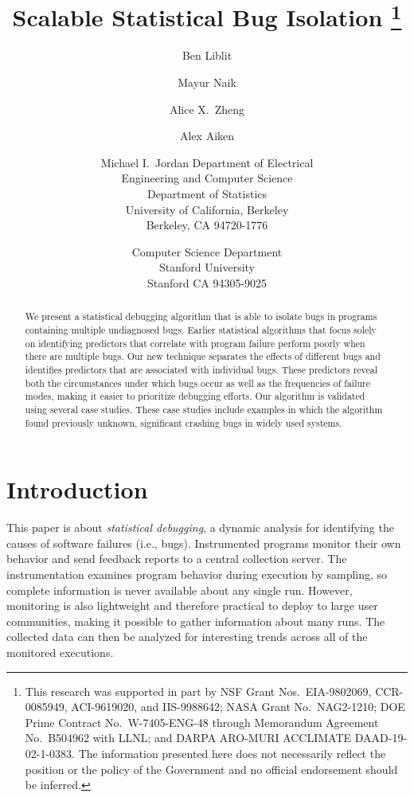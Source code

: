 \documentclass[draft]{sig-alternate}
\title{Scalable Statistical Bug Isolation
  \renewcommand{\footnotemark}[0]{}
  \thanks{This research was supported in part by NSF Grant Nos.\
    EIA-9802069, CCR-0085949, ACI-9619020, and IIS-9988642; NASA Grant
    No.\ NAG2-1210; DOE Prime Contract No.\ W-7405-ENG-48 through
    Memorandum Agreement No.\ B504962 with LLNL; and DARPA ARO-MURI
    ACCLIMATE DAAD-19-02-1-0383.  The information presented here does
    not necessarily reflect the position or the policy of the
    Government and no official endorsement should be inferred.}}
\author{%
  Ben Liblit \eecs
  \and Mayur Naik \stan
  \and Alice X.\ Zheng \eecs
  \and Alex Aiken \stan
  \and Michael I.\ Jordan \both
  \moreauthors
  \eecs Department of Electrical \\
  Engineering and Computer Science \\
  \stat Department of Statistics \\
  University of California, Berkeley \\
  Berkeley, CA 94720-1776
  \and
  \stan Computer Science Department \\
  Stanford University \\
  Stanford CA 94305-9025
}
\newcommand{\termdef}[1]{\emph{#1}}
\begin{document}
\maketitle

\begin{abstract}
  We present a statistical debugging algorithm that is able to
  isolate bugs in programs containing multiple undiagnosed bugs.  
  Earlier statistical algorithms that focus solely on identifying
  predictors that correlate with program failure perform poorly
  when there are multiple bugs.  Our new technique separates the
  effects of different bugs and identifies predictors that are
  associated with individual bugs.  These predictors reveal both the
  circumstances under which bugs occur as well as the frequencies of
  failure modes, making it easier to prioritize debugging efforts.
  Our algorithm is validated using several case studies.  These 
  case studies include examples in which the algorithm found previously 
  unknown, significant crashing bugs in widely used systems.  
\end{abstract}






\section{Introduction}
\label{sec:introduction}

This paper is about \termdef{statistical debugging}, a dynamic
analysis for identifying the causes of software failures (i.e., bugs).
Instrumented programs monitor their own behavior and send feedback
reports to a central collection server.  The instrumentation examines
program behavior during execution by sampling, so complete information is
never available about any single run.  However, monitoring is also
lightweight and therefore practical to deploy to large user
communities, making it possible to gather information about many runs.
The collected data can then be analyzed for interesting trends across
all of the monitored executions.
\end{document}
